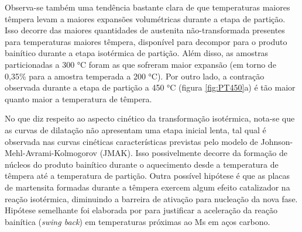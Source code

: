 
Observa-se também uma tendência bastante clara de que temperaturas maiores têmpera levam a maiores expansões volumétricas durante a etapa de partição. Isso decorre das maiores quantidades de austenita não-transformada presentes para temperaturas maiores têmpera, disponível para decompor para o produto bainítico durante a etapa isotérmica de partição. Além disso, as amostras particionadas a 300 °C foram as que sofreram maior expansão (em torno de 0,35\% para a amostra temperada a 200 °C). Por outro lado, a contração observada durante a etapa de partição a 450 °C (figura \ref{fig:PT450}a) é tão maior quanto maior a temperatura de têmpera.

No que diz respeito ao aspecto cinético da transformação isotérmica, nota-se que as curvas de dilatação não apresentam uma etapa inicial lenta, tal qual é observada nas curvas cinéticas características previstas pelo modelo de Johnson-Mehl-Avrami-Kolmogorov (JMAK). Isso possivelmente decorre da formação de núcleos do produto bainítico durante o aquecimento desde a temperatura de têmpera até a temperatura de partição. Outra possível hipótese é que as placas de martensita formadas durante a têmpera exercem algum efeito catalizador na reação isotérmica, diminuindo a barreira de ativação para nucleação da nova fase. Hipótese semelhante foi elaborada por  para justificar a aceleração da reação bainítica (\textit{swing back}) em temperaturas próximas ao Ms em aços carbono.

